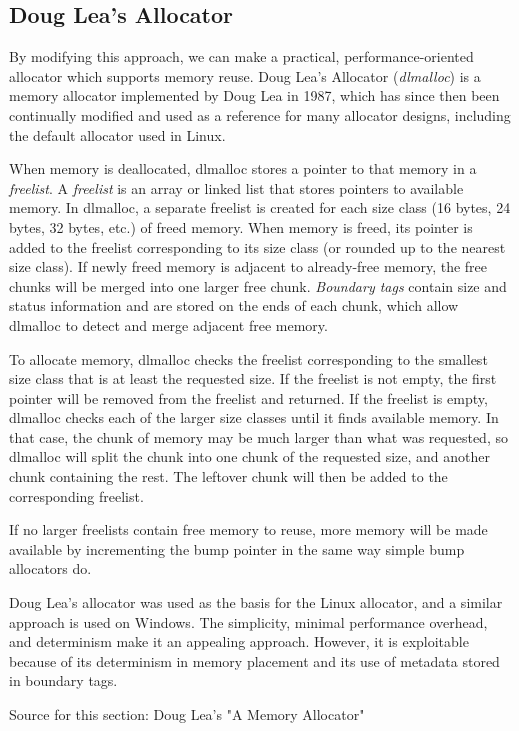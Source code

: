 \documentclass[conference]{IEEEtran}
\begin{document}
\subsection{Doug Lea's Allocator}
By modifying this approach, we can make a practical, performance-oriented allocator which supports memory reuse.
Doug Lea's Allocator (\emph{dlmalloc}) is a memory allocator implemented by Doug Lea in 1987, which has since then been continually modified and used as a reference for many allocator designs, including the default allocator used in Linux.

When memory is deallocated, dlmalloc stores a pointer to that memory in a \emph{freelist}.
A \emph{freelist} is an array or linked list that stores pointers to available memory.
In dlmalloc, a separate freelist is created for each size class (16 bytes, 24 bytes, 32 bytes, etc.) of freed memory.
When memory is freed, its pointer is added to the freelist corresponding to its size class (or rounded up to the nearest size class).
If newly freed memory is adjacent to already-free memory, the free chunks will be merged into one larger free chunk.
\emph{Boundary tags} contain size and status information and are stored on the ends of each chunk, which allow dlmalloc to detect and merge adjacent free memory.

To allocate memory, dlmalloc checks the freelist corresponding to the smallest size class that is at least the requested size.
If the freelist is not empty, the first pointer will be removed from the freelist and returned.
If the freelist is empty, dlmalloc checks each of the larger size classes until it finds available memory.
In that case, the chunk of memory may be much larger than what was requested, so dlmalloc will split the chunk into one chunk of the requested size, and another chunk containing the rest.
The leftover chunk will then be added to the corresponding freelist.

If no larger freelists contain free memory to reuse, more memory will be made available by incrementing the bump pointer in the same way simple bump allocators do.

Doug Lea's allocator was used as the basis for the Linux allocator, and a similar approach is used on Windows.
The simplicity, minimal performance overhead, and determinism make it an appealing approach.
However, it is exploitable because of its determinism in memory placement and its use of metadata stored in boundary tags.

	{\color{red} Source for this section: Doug Lea's "A Memory Allocator" }
\end{document}
